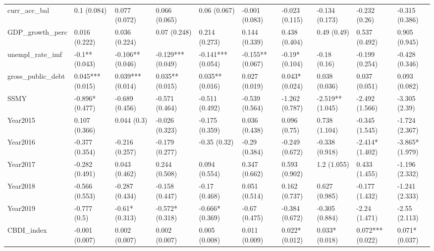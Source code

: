 \begin{table}[ht]
\begin{tabular}{llllllllll}
  curr\_acc\_bal & 0.1 (0.084) & 0.077 (0.072) & 0.066 (0.065) & 0.06 (0.067) & -0.001 (0.083) & -0.023 (0.115) & -0.134 (0.173) & -0.232 (0.26) & -0.315 (0.386) \\ 
  GDP\_growth\_perc & 0.016 (0.222) & 0.036 (0.224) & 0.07 (0.248) & 0.214 (0.273) & 0.144 (0.339) & 0.438 (0.404) & 0.49 (0.49) & 0.537 (0.492) & 0.905 (0.945) \\ 
  unempl\_rate\_imf & -0.1** (0.043) & -0.106** (0.046) & -0.129*** (0.049) & -0.141*** (0.054) & -0.155** (0.067) & -0.19* (0.104) & -0.18 (0.16) & -0.199 (0.254) & -0.428 (0.346) \\ 
  gross\_public\_debt & 0.045*** (0.015) & 0.039*** (0.014) & 0.035** (0.015) & 0.035** (0.016) & 0.027 (0.019) & 0.043* (0.024) & 0.038 (0.036) & 0.037 (0.051) & 0.093 (0.082) \\ 
  SSMY & -0.896* (0.477) & -0.689 (0.456) & -0.571 (0.464) & -0.511 (0.492) & -0.539 (0.564) & -1.262 (0.787) & -2.519** (1.045) & -2.492 (1.566) & -3.305 (2.39) \\ 
  Year2015 & 0.107 (0.366) & 0.044 (0.3) & -0.026 (0.323) & -0.175 (0.359) & 0.036 (0.438) & 0.096 (0.75) & 0.738 (1.104) & -0.345 (1.545) & -1.724 (2.367) \\ 
  Year2016 & -0.377 (0.354) & -0.216 (0.257) & -0.179 (0.277) & -0.35 (0.32) & -0.29 (0.384) & -0.249 (0.672) & -0.338 (0.918) & -2.414* (1.402) & -3.865* (1.979) \\ 
  Year2017 & -0.282 (0.491) & 0.043 (0.462) & 0.244 (0.508) & 0.094 (0.554) & 0.347 (0.662) & 0.593 (0.902) & 1.2 (1.055) & 0.433 (1.455) & -1.196 (2.332) \\ 
  Year2018 & -0.566 (0.553) & -0.287 (0.434) & -0.158 (0.447) & -0.17 (0.468) & 0.051 (0.514) & 0.162 (0.737) & 0.627 (0.985) & -0.177 (1.432) & -1.241 (2.333) \\ 
  Year2019 & -0.777 (0.5) & -0.61* (0.313) & -0.572* (0.318) & -0.666* (0.369) & -0.67 (0.475) & -0.384 (0.672) & -0.305 (0.884) & -2.24 (1.471) & -2.55 (2.113) \\ 
  CBDI\_index & -0.001 (0.007) & 0.002 (0.007) & 0.002 (0.007) & 0.005 (0.008) & 0.011 (0.009) & 0.022* (0.012) & 0.033* (0.018) & 0.072*** (0.022) & 0.071* (0.037) \\ 
   \bottomrule
\end{tabular}
\endgroup
\end{table}
